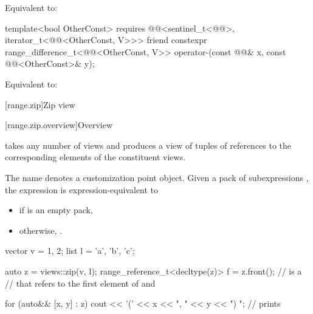 \begin{itemdescr}
\pnum
\effects
Equivalent to: 
\end{itemdescr}

%
\begin{itemdecl}
template<bool OtherConst>
  requires @@<sentinel_t<@@>, iterator_t<@@<OtherConst, V>>>
friend constexpr range_difference_t<@@<OtherConst, V>>
  operator-(const @@& x, const @@<OtherConst>& y);
\end{itemdecl}

\begin{itemdescr}
\pnum
\effects
Equivalent to: 
\end{itemdescr}

[range.zip]{Zip view}

[range.zip.overview]{Overview}

\pnum
{}%
 takes any number of views and
produces a view of tuples of references
to the corresponding elements of the constituent views.

\pnum
{}%
The name  denotes
a customization point object.
Given a pack of subexpressions ,
the expression  is expression-equivalent to
\begin{itemize}
\item
{}
if  is an empty pack,
\item
otherwise, .
\end{itemize}

\begin{example}
\begin{codeblock}
vector v = {1, 2};
list l = {'a', 'b', 'c'};

auto z = views::zip(v, l);
range_reference_t<decltype(z)> f = z.front();   //  is a 
                                                // that refers to the first element of  and 

for (auto&& [x, y] : z) {
  cout << '(' << x << ", " << y << ") ";        // prints 
}
\end{codeblock}
\end{example}

